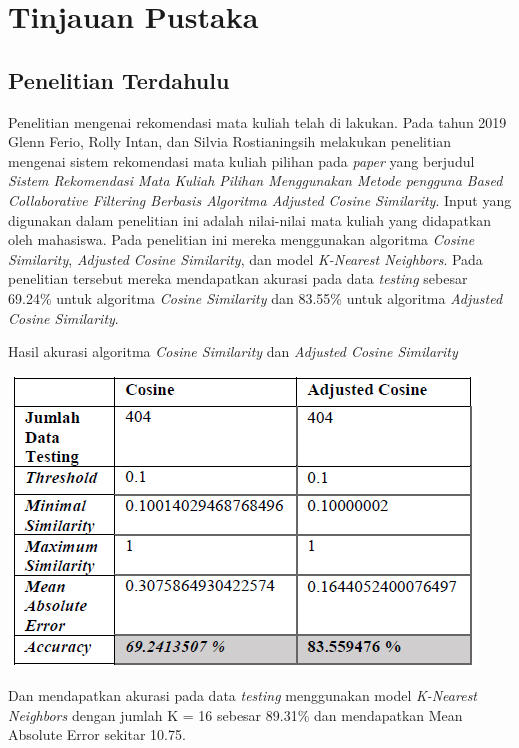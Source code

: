 \chapter{Tinjauan Pustaka}

\section{Penelitian Terdahulu}
Penelitian mengenai rekomendasi mata kuliah telah di lakukan. Pada tahun 2019 Glenn Ferio, Rolly Intan, dan Silvia Rostianingsih melakukan
penelitian mengenai sistem rekomendasi mata kuliah pilihan pada \emph{paper} yang berjudul
\emph{Sistem Rekomendasi Mata Kuliah Pilihan Menggunakan Metode pengguna Based Collaborative Filtering Berbasis Algoritma Adjusted Cosine Similarity}.
Input yang digunakan dalam penelitian ini adalah nilai-nilai mata kuliah yang didapatkan oleh mahasiswa. Pada penelitian ini mereka menggunakan algoritma
\emph{Cosine Similarity}, \emph{Adjusted Cosine Similarity}, dan model \emph{K-Nearest Neighbors}. Pada penelitian tersebut mereka mendapatkan akurasi
pada data \emph{testing} sebesar 69.24\% untuk algoritma \emph{Cosine Similarity} dan 83.55\% untuk algoritma \emph{Adjusted Cosine Similarity}.

\begin{table} [ht] \centering
  \caption{Hasil akurasi algoritma \emph{Cosine Similarity} dan \emph{Adjusted Cosine Similarity} \citep{cosineSimilarity}}
  \vspace*{3mm}
  \includegraphics{gambar/akurasi-algoritma-cosine-similarity.png}
\end{table}

Dan mendapatkan akurasi pada data \emph{testing} menggunakan model \emph{K-Nearest Neighbors} dengan jumlah K = 16 sebesar 89.31\%
dan mendapatkan Mean Absolute Error sekitar 10.75.

